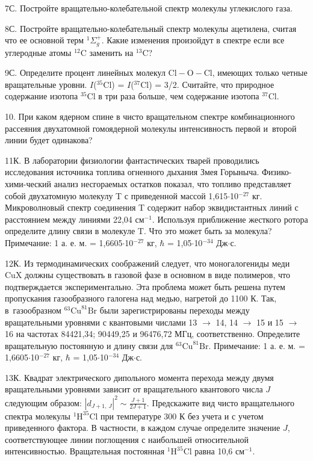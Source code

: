 \par
7С. Постройте вращательно-колебательной спектр молекулы углекислого газа.
\par
8С. Постройте вращательно-колебательный спектр молекулы ацетилена, считая что ее основной терм $^1\Sigma^+_g$. Какие изменения произойдут в спектре если все углеродные атомы $^{12}\text{C}$ заменить на $^{13}\text{C}$?
\par
9С. Определите процент линейных молекул $\text{Cl}-\text{O}-\text{Cl}$, имеющих только четные вращательные уровни. $I$($^{35}\text{Cl}$) = $I$($^{37}\text{Cl}$) = 3/2. Считайте, что природное содержание изотопа $^{35}\text{Cl}$ в три раза больше, чем содержание изотопа $^{37}\text{Cl}$.
\par
10. При каком ядерном спине в чисто вращательном спектре комбинационного рассеяния двухатомной гомоядерной молекулы интенсивность первой и~второй линии будет одинакова?
\par
11К. В лаборатории физиологии фантастических тварей проводились исследования источника топлива огненного дыхания Змея Горыныча. Физико-хими-ческий анализ несгораемых остатков показал, что топливо представляет собой двухатомную молекулу T с приведенной массой 1,615$\cdot$10$^{-27}$ кг. Микроволновый спектр соединения T содержит набор эквидистантных линий с расстоянием между линиями 22,04 см$^{-1}$. Используя приближение жесткого ротора определите длину связи в молекуле T. Что это может быть за молекула? Примечание: 1 а. е. м. = 1,6605$\cdot$10$^{-27}$ кг, $\hbar$ = 1,05$\cdot$10$^{-34}$ Дж$\cdot$с.
\par
12К. Из термодинамических соображений следует, что моногалогениды меди CuX должны существовать в газовой фазе в основном в виде полимеров, что подтверждается экспериментально. Эта проблема может быть решена путем пропускания газообразного галогена над медью, нагретой до 1100 К. Так, в~газообразном $^{63}\text{Cu}^{81}\text{Br}$ были зарегистрированы переходы между вращательными уровнями с квантовыми числами 13 $\rightarrow$ 14, 14 $\rightarrow$ 15 и 15 $\rightarrow$ 16 на частотах 84421,34; 90449,25 и 96476,72 МГц, соответственно. Определите вращательную постоянную и длину связи для $^{63}\text{Cu}^{81}\text{Br}$. Примечание: 1 а. е. м. = 1,6605$\cdot$10$^{-27}$ кг, $\hbar$ = 1,05$\cdot$10$^{-34}$ Дж$\cdot$с.
\par
13К. Квадрат электрического дипольного момента перехода между двумя вращательными уровнями зависит от вращательного квантового числа $J$ следующим образом: $|d_{J+1,\,J}|^2 \sim \frac{J+1}{2J+1}$. Предскажите вид чисто вращательного спектра молекулы $^{1}\text{H}^{35}\text{Cl}$ при температуре 300 К без учета и с учетом приведенного фактора. В частности, в каждом случае определите значение $J$, соответствующее линии поглощения с наибольшей относительной интенсивностью. Вращательная постоянная $^{1}\text{H}^{35}\text{Cl}$ равна 10,6 см$^{-1}$.
\par